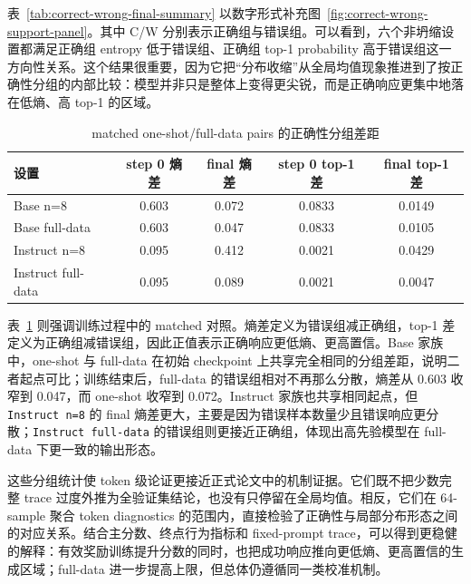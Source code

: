 \documentclass[12pt,a4paper]{ctexart}
\begin{document}
表~\ref{tab:correct-wrong-final-summary} 以数字形式补充图~\ref{fig:correct-wrong-support-panel}。其中 C/W 分别表示正确组与错误组。可以看到，六个非坍缩设置都满足正确组 entropy 低于错误组、正确组 top-1 probability 高于错误组这一方向性关系。这个结果很重要，因为它把“分布收缩”从全局均值现象推进到了按正确性分组的内部比较：模型并非只是整体上变得更尖锐，而是正确响应更集中地落在低熵、高 top-1 的区域。

\begin{table}[H]
    \centering
    \caption{matched one-shot/full-data pairs 的正确性分组差距}
    \label{tab:correct-wrong-gap-summary}
    \small
    \begin{tabular}{lcccc}
        \toprule
        设置 & step 0 熵差 & final 熵差 & step 0 top-1 差 & final top-1 差 \\
        \midrule
        Base n=8 & 0.603 & 0.072 & 0.0833 & 0.0149 \\
        Base full-data & 0.603 & 0.047 & 0.0833 & 0.0105 \\
        Instruct n=8 & 0.095 & 0.412 & 0.0021 & 0.0429 \\
        Instruct full-data & 0.095 & 0.089 & 0.0021 & 0.0047 \\
        \bottomrule
    \end{tabular}
\end{table}

表~\ref{tab:correct-wrong-gap-summary} 则强调训练过程中的 matched 对照。熵差定义为错误组减正确组，top-1 差定义为正确组减错误组，因此正值表示正确响应更低熵、更高置信。Base 家族中，one-shot 与 full-data 在初始 checkpoint 上共享完全相同的分组差距，说明二者起点可比；训练结束后，full-data 的错误组相对不再那么分散，熵差从 0.603 收窄到 0.047，而 one-shot 收窄到 0.072。Instruct 家族也共享相同起点，但 \texttt{Instruct n=8} 的 final 熵差更大，主要是因为错误样本数量少且错误响应更分散；\texttt{Instruct full-data} 的错误组则更接近正确组，体现出高先验模型在 full-data 下更一致的输出形态。

这些分组统计使 token 级论证更接近正式论文中的机制证据。它们既不把少数完整 trace 过度外推为全验证集结论，也没有只停留在全局均值。相反，它们在 64-sample 聚合 token diagnostics 的范围内，直接检验了正确性与局部分布形态之间的对应关系。结合主分数、终点行为指标和 fixed-prompt trace，可以得到更稳健的解释：有效奖励训练提升分数的同时，也把成功响应推向更低熵、更高置信的生成区域；full-data 进一步提高上限，但总体仍遵循同一类校准机制。

\end{document}
